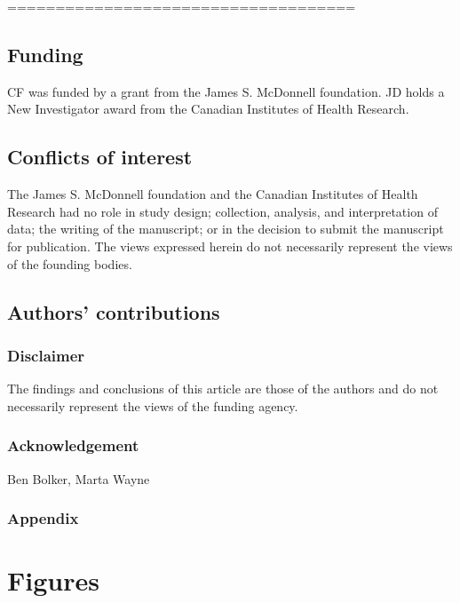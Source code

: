 \documentclass[12pt,]{article}
\begin{document}
====================================
\subsection{Funding}\label{Funding}

CF was funded by a grant from the James S. McDonnell foundation. JD holds a New Investigator award from the Canadian Institutes of Health Research.

\subsection{Conflicts of interest}\label{Conflicts-of-Interest}

The James S. McDonnell foundation and the Canadian Institutes of Health Research had no role in study design; collection, analysis, and interpretation of data; the writing of the manuscript; or in the decision to submit the manuscript for publication.  The views expressed herein do not necessarily represent the views of the founding bodies.

\subsection{Authors' contributions}\label{Authors'-contributions}

\subsubsection{Disclaimer}\label{disclaimer}

The findings and conclusions of this article are those of the authors
and do not necessarily represent the views of the funding agency.

\subsubsection{Acknowledgement}\label{Acknowledgement}
Ben Bolker,  Marta Wayne

\subsubsection{Appendix}\label{appendix-1}

\FloatBarrier

\section{Figures}
\end{document}
